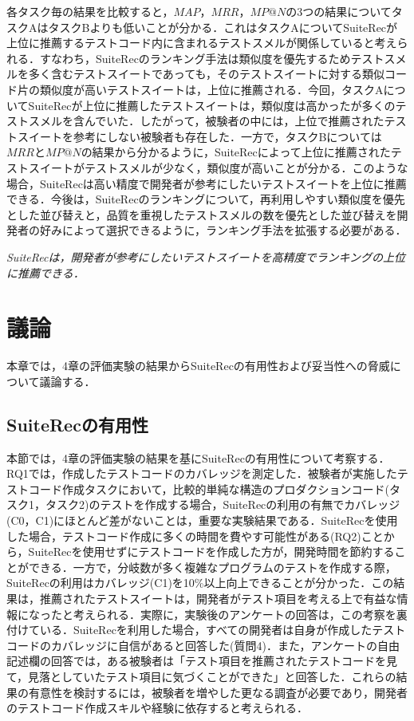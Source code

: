 \documentclass[12pt]{jarticle} %
\begin{document}
各タスク毎の結果を比較すると，$MAP$，$MRR$，$MP@N$の3つの結果についてタスクAはタスクBよりも低いことが分かる．これはタスクAについて{\sf SuiteRec}が上位に推薦するテストコード内に含まれるテストスメルが関係していると考えられる．すなわち，{\sf SuiteRec}のランキング手法は類似度を優先するためテストスメルを多く含むテストスイートであっても，そのテストスイートに対する類似コード片の類似度が高いテストスイートは，上位に推薦される．今回，タスクAについて{\sf SuiteRec}が上位に推薦したテストスイートは，類似度は高かったが多くのテストスメルを含んでいた．したがって，被験者の中には，上位で推薦されたテストスイートを参考にしない被験者も存在した．一方で，タスクBについては$MRR$と$MP@N$の結果から分かるように，{\sf SuiteRec}によって上位に推薦されたテストスイートがテストスメルが少なく，類似度が高いことが分かる．このような場合，{\sf SuiteRec}は高い精度で開発者が参考にしたいテストスイートを上位に推薦できる．今後は，{\sf SuiteRec}のランキングについて，再利用しやすい類似度を優先とした並び替えと，品質を重視したテストスメルの数を優先とした並び替えを開発者の好みによって選択できるように，ランキング手法を拡張する必要がある．

\vspace{\baselineskip}

\begin{breakbox}
\textit{{\sf SuiteRec}は，開発者が参考にしたいテストスイートを高精度でランキングの上位に推薦できる．}
\end{breakbox}


\newpage
\section{議論}

本章では，4章の評価実験の結果から{\sf SuiteRec}の有用性および妥当性への脅威について議論する．

\subsection{SuiteRecの有用性}
本節では，4章の評価実験の結果を基に{\sf SuiteRec}の有用性について考察する．RQ1では，作成したテストコードのカバレッジを測定した．被験者が実施したテストコード作成タスクにおいて，比較的単純な構造のプロダクションコード(タスク1，タスク2)のテストを作成する場合，{\sf SuiteRec}の利用の有無でカバレッジ(C0，C1)にほとんど差がないことは，重要な実験結果である．{\sf SuiteRec}を使用した場合，テストコード作成に多くの時間を費やす可能性がある(RQ2)ことから，{\sf SuiteRec}を使用せずにテストコードを作成した方が，開発時間を節約することができる．一方で，分岐数が多く複雑なプログラムのテストを作成する際，{\sf SuiteRec}の利用はカバレッジ(C1)を10\%以上向上できることが分かった．この結果は，推薦されたテストスイートは，開発者がテスト項目を考える上で有益な情報になったと考えられる．実際に，実験後のアンケートの回答は，この考察を裏付けている．{\sf SuiteRec}を利用した場合，すべての開発者は自身が作成したテストコードのカバレッジに自信があると回答した(質問4)．また，アンケートの自由記述欄の回答では，ある被験者は「テスト項目を推薦されたテストコードを見て，見落としていたテスト項目に気づくことができた」と回答した．これらの結果の有意性を検討するには，被験者を増やした更なる調査が必要であり，開発者のテストコード作成スキルや経験に依存すると考えられる．
\end{document}
